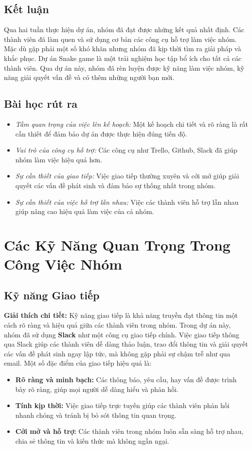 \documentclass[a4paper,12pt]{article}
\begin{document}
\subsection{Kết luận}
Qua hai tuần thực hiện dự án, nhóm đã đạt được những kết quả nhất định. Các thành viên đã làm quen và sử dụng cơ bản các công cụ hỗ trợ làm việc nhóm. Mặc dù gặp phải một số khó khăn nhưng nhóm đã kịp thời tìm ra giải pháp và khắc phục. Dự án Snake game là một trải nghiệm học tập bổ ích cho tất cả các thành viên. Qua dự án này, nhóm đã rèn luyện được kỹ năng làm việc nhóm, kỹ năng giải quyết vấn đề và có thêm những người bạn mới.

\subsection{Bài học rút ra}
\begin{itemize}
    \item \textit{Tầm quan trọng của việc lên kế hoạch:} Một kế hoạch chi tiết và rõ ràng là rất cần thiết để đảm bảo dự án được thực hiện đúng tiến độ.
    \item \textit{Vai trò của công cụ hỗ trợ:} Các công cụ như Trello, Github, Slack đã giúp nhóm làm việc hiệu quả hơn.
    \item \textit{Sự cần thiết của giao tiếp:} Việc giao tiếp thường xuyên và cởi mở giúp giải quyết các vấn đề phát sinh và đảm bảo sự thống nhất trong nhóm.
    \item \textit{Sự cần thiết của việc hỗ trợ lẫn nhau:} Việc các thành viên hỗ trợ lẫn nhau giúp nâng cao hiệu quả làm việc của cả nhóm.
\end{itemize}

\newpage
\section{Các Kỹ Năng Quan Trọng Trong Công Việc Nhóm}

\subsection{Kỹ năng Giao tiếp}
\textbf{Giải thích chi tiết:}  
Kỹ năng giao tiếp là khả năng truyền đạt thông tin một cách rõ ràng và hiệu quả giữa các thành viên trong nhóm. Trong dự án này, nhóm đã sử dụng \textbf{Slack} như một công cụ giao tiếp chính. Việc giao tiếp thông qua Slack giúp các thành viên dễ dàng thảo luận, trao đổi thông tin và giải quyết các vấn đề phát sinh ngay lập tức, mà không gặp phải sự chậm trễ như qua email. Một số đặc điểm của giao tiếp hiệu quả là:
\begin{itemize}
    \item \textbf{Rõ ràng và minh bạch:} Các thông báo, yêu cầu, hay vấn đề được trình bày rõ ràng, giúp mọi người dễ dàng hiểu và phản hồi.
    \item \textbf{Tính kịp thời:} Việc giao tiếp trực tuyến giúp các thành viên phản hồi nhanh chóng và tránh bị bỏ sót thông tin quan trọng.
    \item \textbf{Cởi mở và hỗ trợ:} Các thành viên trong nhóm luôn sẵn sàng hỗ trợ nhau, chia sẻ thông tin và kiến thức mà không ngần ngại.
\end{itemize}
\end{document}
